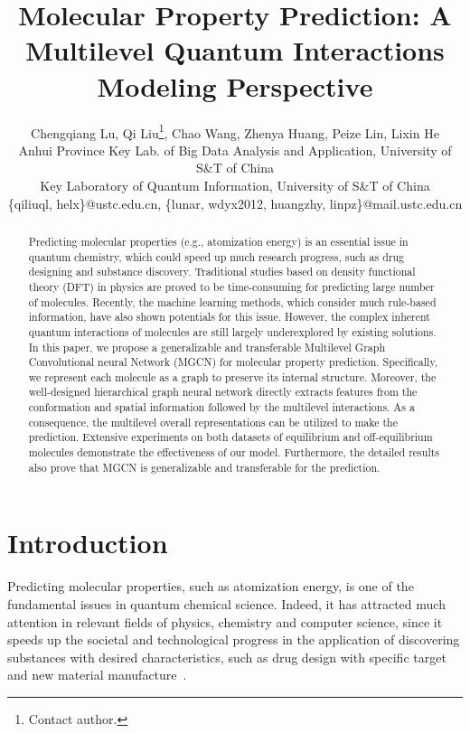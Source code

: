 \documentclass[letterpaper]{article} \usepackage{bm}
\begin{document}
\author{
Chengqiang Lu{\normalfont,\;}
Qi Liu\thanks{Contact author.}{\normalfont,\;}
Chao Wang{\normalfont,\;}
Zhenya Huang{\normalfont,\;}
Peize Lin{\normalfont,\;}
Lixin He \\
	Anhui Province Key Lab. of Big Data Analysis and Application, University of S\&T of China\\Key Laboratory of Quantum Information, University of S\&T of China
	\\ \{qiliuql, helx\}@ustc.edu.cn, \{lunar, wdyx2012, huangzhy, linpz\}@mail.ustc.edu.cn}
	


\title{Molecular Property Prediction: A Multilevel Quantum Interactions\\ Modeling Perspective}
\maketitle

\begin{abstract}
Predicting molecular properties (e.g., atomization energy) is an essential issue in quantum chemistry, which could speed up much research progress, such as drug designing and substance discovery. Traditional studies based on density functional theory (DFT) in physics are proved to be time-consuming for predicting large number of molecules. Recently, the machine learning methods, which consider much rule-based information, have also shown potentials for this issue. However, the complex inherent quantum interactions of molecules are still largely underexplored by existing solutions. In this paper, we propose a generalizable and transferable Multilevel Graph Convolutional neural Network (MGCN) for molecular property prediction. Specifically, we represent each molecule as a graph to preserve its internal structure. Moreover, the well-designed hierarchical graph neural network directly extracts features from the conformation and spatial information followed by the multilevel interactions. As a consequence, the multilevel overall representations can be utilized to make the prediction. Extensive experiments on both datasets of equilibrium and off-equilibrium molecules demonstrate the effectiveness of our model. Furthermore, the detailed results also prove that MGCN is generalizable and transferable for the prediction.
\end{abstract}


\section{Introduction}
Predicting molecular properties, such as atomization energy, is one of the fundamental issues in quantum chemical science.
Indeed, it has attracted much attention in relevant fields of physics, chemistry and computer science, since it speeds up the societal and technological progress in the application of discovering substances with desired characteristics, such as drug design with specific target and new material manufacture~\cite{becke2007quantum,oglic2017active}.
\end{document}
